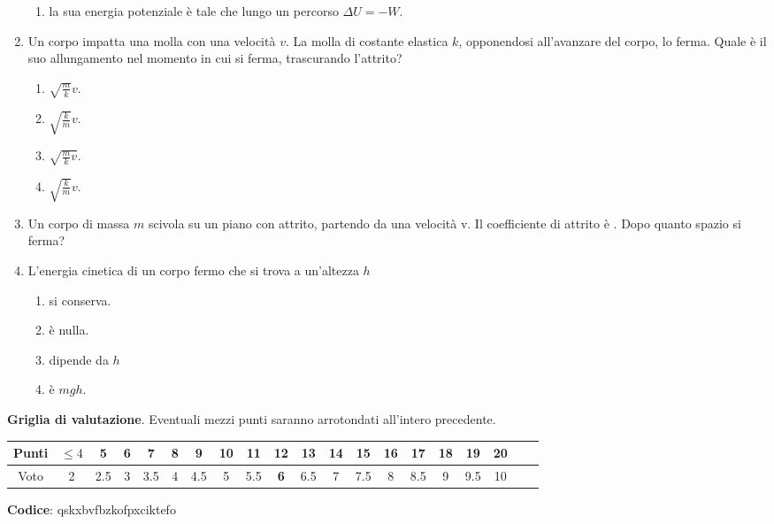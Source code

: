 \documentclass{article}
\begin{document}
\begin{enumerate}
\begin{enumerate}[label=\Alph*.]
    \item la sua energia potenziale è tale che lungo un percorso $\Delta U=-W$.
  \end{enumerate}
  \item Un corpo impatta una molla con una velocità $v$. La molla di costante elastica $k$, opponendosi all'avanzare del corpo, lo ferma. Quale è il suo allungamento nel momento in cui si ferma, trascurando l'attrito?
  \begin{enumerate}[label=\Alph*.]
    \item $\sqrt{\frac{m}{k}}v$.
    \item $\sqrt{\frac{k}{m}}v$.
    \item $\sqrt{\frac{m}{k}v}$.
    \item $\sqrt{\frac{k}{m}}v$.
  \end{enumerate}
  \item Un corpo di massa $m$ scivola su un piano con attrito, partendo da una velocità v. Il coefficiente di attrito è \mu. Dopo quanto spazio si ferma?
  \begin{enumerate}[label=\Alph*.]
    \item $\frac{2v^2}{g\mu}}$.
    \item $\frac{1}{2}v^2+\mu g$.
    \item $\frac{v^2}{2g\mu}}$.
    \item $\frac{1}{2}v^2-\mu g$.
  \end{enumerate}
  \item L'energia cinetica di un corpo fermo che si trova a un'altezza $h$
  \begin{enumerate}[label=\Alph*.]
    \item si conserva.
    \item è nulla.
    \item dipende da $h$
    \item è $mgh$.
  \end{enumerate}
\end{enumerate}








\newpage \maketitle \centering \textbf{Griglia di valutazione}. Eventuali mezzi punti saranno arrotondati all'intero precedente. \begin{table}[h]     \centering \begin{tabular}{|c|c|c|c|c|c|c|c|c|c|c|c|c|c|c|c|c|c|c|c|} \hline Punti &  $\leq 4$ & 5 & 6 & 7 & 8 & 9 & 10 & 11 & \textbf{12} & 13 & 14 & 15 & 16 & 17 & 18 & 19 & 20 \\ \hline Voto & 2 & 2.5 & 3 & 3.5 & 4 & 4.5 & 5 & 5.5 & \textbf{6} & 6.5 & 7 & 7.5 & 8 & 8.5 & 9 & 9.5 & 10 \\ \hline \end{tabular} \end{table}
\textbf{Codice}: qskxbvfbzkofpxciktefo
\end{document}
